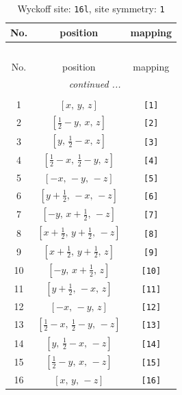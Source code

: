 \documentclass[fleqn,8pt]{jsarticle}
\begin{document}
\begin{longtable}{ccc}
\caption{Wyckoff site: {\tt 16l}, site symmetry: {\tt 1}}
 \\
 \hline \hline
No. & position & mapping \\ \hline \endfirsthead

\multicolumn{2}{l}{\tablename\ \thetable{}} \\
 \hline \hline
No. & position & mapping \\ \hline \endhead

 \hline \hline
\multicolumn{2}{r}{\footnotesize\it continued ...} \\ \endfoot

 \hline \hline
\multicolumn{2}{r}{} \\ \endlastfoot

1 & $\left[ x,\, y,\, z \right]$ & {\tt [1]} \\ \hline
2 & $\left[ \frac{1}{2} - y,\, x,\, z \right]$ & {\tt [2]} \\ \hline
3 & $\left[ y,\, \frac{1}{2} - x,\, z \right]$ & {\tt [3]} \\ \hline
4 & $\left[ \frac{1}{2} - x,\, \frac{1}{2} - y,\, z \right]$ & {\tt [4]} \\ \hline
5 & $\left[ - x,\, - y,\, - z \right]$ & {\tt [5]} \\ \hline
6 & $\left[ y + \frac{1}{2},\, - x,\, - z \right]$ & {\tt [6]} \\ \hline
7 & $\left[ - y,\, x + \frac{1}{2},\, - z \right]$ & {\tt [7]} \\ \hline
8 & $\left[ x + \frac{1}{2},\, y + \frac{1}{2},\, - z \right]$ & {\tt [8]} \\ \hline
9 & $\left[ x + \frac{1}{2},\, y + \frac{1}{2},\, z \right]$ & {\tt [9]} \\ \hline
10 & $\left[ - y,\, x + \frac{1}{2},\, z \right]$ & {\tt [10]} \\ \hline
11 & $\left[ y + \frac{1}{2},\, - x,\, z \right]$ & {\tt [11]} \\ \hline
12 & $\left[ - x,\, - y,\, z \right]$ & {\tt [12]} \\ \hline
13 & $\left[ \frac{1}{2} - x,\, \frac{1}{2} - y,\, - z \right]$ & {\tt [13]} \\ \hline
14 & $\left[ y,\, \frac{1}{2} - x,\, - z \right]$ & {\tt [14]} \\ \hline
15 & $\left[ \frac{1}{2} - y,\, x,\, - z \right]$ & {\tt [15]} \\ \hline
16 & $\left[ x,\, y,\, - z \right]$ & {\tt [16]} \\
\end{longtable}
\end{document}

